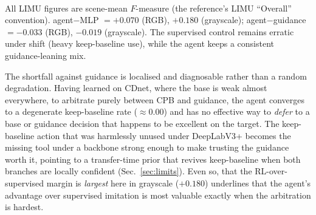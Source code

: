 \documentclass[sn-basic]{sn-jnl}
\newcommand{\Fm}{$F$-measure}
\begin{document}
\begin{table}[t]\centering
\caption{Cross-dataset transfer under \emph{PSPNet} guidance, both CPB representations,
scene-mean \Fm. PSPNet guidance itself transfers strongly ($0.703$), so trusting it is
already the best simple policy; the agent improves the base and beats the supervised
control in both representations, but cannot exceed near-ceiling guidance, an honest
boundary of the method.}
\label{tab:limupsp}
\small
{}
\\[3pt]
\footnotesize
All LIMU figures are scene-mean \Fm{} (the reference's LIMU ``Overall'' convention).
agent$-$MLP $=+0.070$ (RGB), $+0.180$ (grayscale); agent$-$guidance $=-0.033$ (RGB),
$-0.019$ (grayscale). The supervised control remains erratic under shift (heavy
keep-baseline use), while the agent keeps a consistent guidance-leaning mix.
\end{table}

The shortfall against guidance is localised and diagnosable rather than a random
degradation. Having learned on CDnet, where the base is weak almost everywhere, to
arbitrate purely between CPB and guidance, the agent converges to a degenerate
keep-baseline rate ($\approx0.00$) and has no effective way to \emph{defer} to a base or
guidance decision that happens to be excellent on the target. The keep-baseline action
that was harmlessly unused under DeepLabV3+ becomes the missing tool under a backbone
strong enough to make trusting the guidance worth it, pointing to a transfer-time prior
that revives keep-baseline when both branches are locally confident
(Sec.~\ref{sec:limits}). Even so, that the RL-over-supervised margin is \emph{largest}
here in grayscale ($+0.180$) underlines that the agent's advantage over supervised
imitation is most valuable exactly when the arbitration is hardest.
\end{document}
